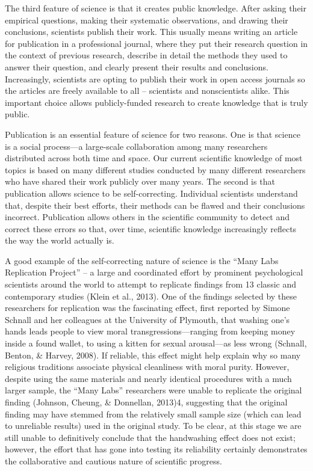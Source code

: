 \documentclass[]{book}
\theoremstyle{definition}
\theoremstyle{definition}
\theoremstyle{remark}
\begin{document}
The third feature of science is that it creates public knowledge. After
asking their empirical questions, making their systematic observations,
and drawing their conclusions, scientists publish their work. This
usually means writing an article for publication in a professional
journal, where they put their research question in the context of
previous research, describe in detail the methods they used to answer
their question, and clearly present their results and conclusions.
Increasingly, scientists are opting to publish their work in open access
journals so the articles are freely available to all -- scientists and
nonscientists alike. This important choice allows publicly-funded
research to create knowledge that is truly public.

Publication is an essential feature of science for two reasons. One is
that science is a social process---a large-scale collaboration among
many researchers distributed across both time and space. Our current
scientific knowledge of most topics is based on many different studies
conducted by many different researchers who have shared their work
publicly over many years. The second is that publication allows science
to be self-correcting. Individual scientists understand that, despite
their best efforts, their methods can be flawed and their conclusions
incorrect. Publication allows others in the scientific community to
detect and correct these errors so that, over time, scientific knowledge
increasingly reflects the way the world actually is.

A good example of the self-correcting nature of science is the ``Many
Labs Replication Project'' -- a large and coordinated effort by
prominent psychological scientists around the world to attempt to
replicate findings from 13 classic and contemporary studies (Klein et
al., 2013). One of the findings selected by these researchers for
replication was the fascinating effect, first reported by Simone Schnall
and her colleagues at the University of Plymouth, that washing one's
hands leads people to view moral transgressions---ranging from keeping
money inside a found wallet, to using a kitten for sexual arousal---as
less wrong (Schnall, Benton, \& Harvey, 2008). If reliable, this effect
might help explain why so many religious traditions associate physical
cleanliness with moral purity. However, despite using the same materials
and nearly identical procedures with a much larger sample, the ``Many
Labs'' researchers were unable to replicate the original finding
(Johnson, Cheung, \& Donnellan, 2013)4, suggesting that the original
finding may have stemmed from the relatively small sample size (which
can lead to unreliable results) used in the original study. To be clear,
at this stage we are still unable to definitively conclude that the
handwashing effect does not exist; however, the effort that has gone
into testing its reliability certainly demonstrates the collaborative
and cautious nature of scientific progress.
\end{document}
